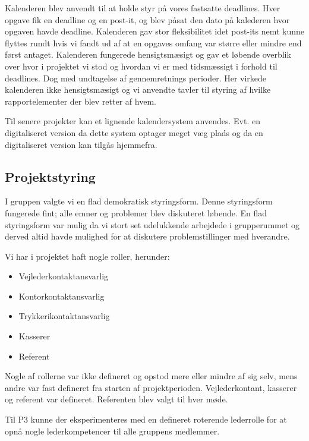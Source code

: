 Kalenderen blev anvendt til at holde styr p\aa{} vores fastsatte deadlines. Hver opgave fik en deadline og en post-it, og blev p\aa{}sat den dato p\aa{} kalederen hvor opgaven havde deadline.
Kalenderen gav stor fleksibilitet idet post-its nemt kunne flyttes rundt hvis vi fandt ud af at en opgaves omfang var st\o{}rre eller mindre end f\o{}rst antaget.
Kalenderen fungerede hensigtsm\ae{}sigt og gav et l\o{}bende overblik over hvor i projektet vi stod og hvordan vi er med tidsm\ae{}ssigt i forhold til deadlines. 
Dog med undtagelse af gennemretnings perioder. Her virkede kalenderen ikke hensigtsm\ae{}sigt og vi anvendte tavler til styring af hvilke rapportelementer der blev retter af hvem. 

Til senere projekter kan et lignende kalendersystem anvendes. Evt. en digitaliseret version da dette system optager meget v\ae{}g plads og da en digitaliseret version kan tilg\aa{}s hjemmefra. 

\subsection{Projektstyring}
I gruppen valgte vi en flad demokratisk styringsform. Denne styringsform fungerede fint; alle emner og problemer blev diskuteret l\o{}bende. En flad styringsform var mulig da vi stort set udelukkende arbejdede i grupperummet og derved altid havde mulighed for at diskutere problemstillinger med hverandre. 

Vi har i projektet haft nogle roller, herunder:
\begin{itemize}
\item Vejlederkontaktansvarlig
\item Kontorkontaktansvarlig
\item Trykkerikontaktansvarlig
\item Kasserer
\item Referent
\end{itemize}
Nogle af rollerne var ikke defineret og opstod mere eller mindre af sig selv, mens andre var fast defineret fra starten af projektperioden. Vejlederkontant, kasserer og referent var defineret. Referenten blev valgt til hver m\o{}de. 

Til P3 kunne der eksperimenteres med en defineret roterende lederrolle for at opn\aa{} nogle lederkompetencer til alle gruppens medlemmer. 






